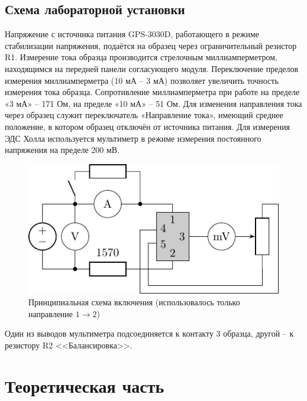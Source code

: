 \documentclass[a4paper,14pt]{extarticle}
\begin{document}
\subsection{Схема лабораторной установки}
Напряжение с источника питания GPS-3030D, работающего в режиме стабилизации напряжения, подаётся на образец через ограничительный резистор R1. Измерение тока образца производится стрелочным миллиамперметром, находящимся на передней панели согласующего модуля. Переключение пределов измерения миллиамперметра (10 мА – 3 мА) позволяет увеличить точность измерения тока образца. Сопротивление миллиамперметра при работе на пределе «3 мА» – 171 Ом, на пределе «10 мА» – 51 Ом. Для изменения направления тока через образец служит переключатель «Направление тока», имеющий среднее положение, в котором образец отключён от источника питания.
Для измерения ЭДС Холла используется мультиметр в режиме измерения постоянного напряжения на пределе 200 мВ. 
\begin{figure}[h!]
	\centering
	\includegraphics[scale=1.5]{ris/chem.pdf}
	\caption{Принципиальная схема включения (использовалось только направление $1\to2$)}
	\label{fig:figure2}
\end{figure}
Один из выводов мультиметра подсоединяется к контакту 3 образца, другой – к резистору R2 <<Балансировка>>.

\section{Теоретическая часть}


\end{document}
